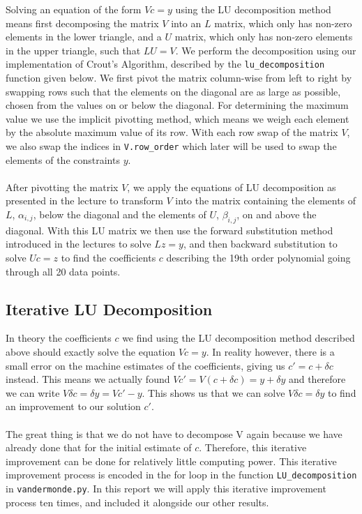 Solving an equation of the form $Vc = y$ using the LU decomposition method means first decomposing the matrix $V$ into an $L$ matrix, which only has non-zero elements in the lower triangle, and a $U$ matrix, which only has non-zero elements in the upper triangle, such that $LU = V$. We perform the decomposition using our implementation of Crout's Algorithm, described by the \texttt{lu\_decomposition} function given below. We first pivot the matrix column-wise from left to right by swapping rows such that the elements on the diagonal are as large as possible, chosen from the values on or below the diagonal. For determining the maximum value we use the implicit pivotting method, which means we weigh each element by the absolute maximum value of its row. With each row swap of the matrix $V$, we also swap the indices in \texttt{V.row\_order} which later will be used to swap the elements of the constraints $y$. 
\\ \\
After pivotting the matrix $V$, we apply the equations of LU decomposition as presented in the lecture to transform $V$ into the matrix containing the elements of $L$, $\alpha_{i,j}$, below the diagonal and the elements of $U$, $\beta_{i,j}$, on and above the diagonal. With this LU matrix we then use the forward substitution method introduced in the lectures to solve $Lz = y$, and then backward substitution to solve $Uc = z$ to find the coefficients $c$ describing the 19th order polynomial going through all 20 data points.



 
\subsection{Iterative LU Decomposition}

In theory the coefficients $c$ we find using the LU decomposition method described above should exactly solve the equation $Vc = y$. In reality however, there is a small error on the machine estimates of the coefficients, giving us $c' = c + \delta c$ instead. This means we actually found $Vc' = V(c+\delta c) = y + \delta y$ and therefore we can write $V \delta c = \delta y = Vc' - y$. This shows us that we can solve $V \delta c = \delta y$ to find an improvement to our solution $c'$. 
\\ \\
The great thing is that we do not have to decompose V again because we have already done that for the initial estimate of $c$. Therefore, this iterative improvement can be done for relatively little computing power. This iterative improvement process is encoded in the for loop in the function \texttt{LU\_decomposition} in \texttt{vandermonde.py}. In this report we will apply this iterative improvement process ten times, and included it alongside our other results.


